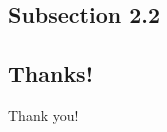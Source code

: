 \documentclass{beamer}
\begin{document}
\subsection{Subsection 2.2}


\subsection*{Thanks!}


\begin{frame}{\subsecname}
\centering    \Huge{Thank you!}
\end{frame}
\end{document}
